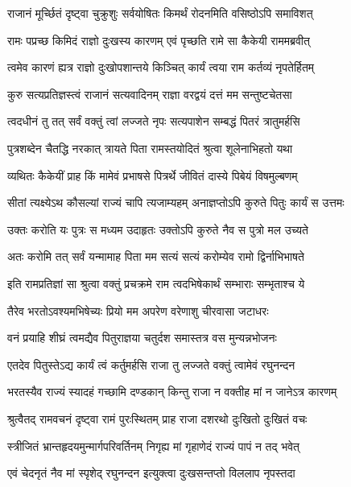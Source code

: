 \twolineshloka
{राजानं मूर्च्छितं दृष्ट्वा चुक्रुशुः सर्वयोषितः}
{किमर्थं रोदनमिति वसिष्ठोऽपि समाविशत्} %

\twolineshloka
{रामः पप्रच्छ किमिदं राज्ञो दुःखस्य कारणम्}
{एवं पृच्छति रामे सा कैकेयी राममब्रवीत्} %

\twolineshloka
{त्वमेव कारणं ह्यत्र राज्ञो दुःखोपशान्तये}
{किञ्चित् कार्यं त्वया राम कर्तव्यं नृपतेर्हितम्} %

\twolineshloka
{कुरु सत्यप्रतिज्ञस्त्वं राजानं सत्यवादिनम्}
{राज्ञा वरद्वयं दत्तं मम सन्तुष्टचेतसा} %

\twolineshloka
{त्वदधीनं तु तत् सर्वं वक्तुं त्वां लज्जते नृपः}
{सत्यपाशेन सम्बद्धं पितरं त्रातुमर्हसि} %

\twolineshloka
{पुत्रशब्देन चैतद्धि नरकात् त्रायते पिता}
{रामस्तयोदितं श्रुत्वा शूलेनाभिहतो यथा} %

\twolineshloka
{व्यथितः कैकेयीं प्राह किं मामेवं प्रभाषसे}
{पित्रर्थे जीवितं दास्ये पिबेयं विषमुल्बणम्} %

\twolineshloka
{सीतां त्यक्ष्येऽथ कौसल्यां राज्यं चापि त्यजाम्यहम्}
{अनाज्ञप्तोऽपि कुरुते पितुः कार्यं स उत्तमः} %

\twolineshloka
{उक्तः करोति यः पुत्रः स मध्यम उदाहृतः}
{उक्तोऽपि कुरुते नैव स पुत्रो मल उच्यते} %

\twolineshloka
{अतः करोमि तत् सर्वं यन्मामाह पिता मम}
{सत्यं सत्यं करोम्येव रामो द्विर्नाभिभाषते} %

\twolineshloka
{इति रामप्रतिज्ञां सा श्रुत्वा वक्तुं प्रचक्रमे}
{राम त्वदभिषेकार्थं सम्भाराः सम्भृताश्च ये} %

\twolineshloka
{तैरेव भरतोऽवश्यमभिषेच्यः प्रियो मम}
{अपरेण वरेणाशु चीरवासा जटाधरः} %

\twolineshloka
{वनं प्रयाहि शीघ्रं त्वमद्यैव पितुराज्ञया}
{चतुर्दश समास्तत्र वस मुन्यन्नभोजनः} %

\twolineshloka
{एतदेव पितुस्तेऽद्य कार्यं त्वं कर्तुमर्हसि}
{राजा तु लज्जते वक्तुं त्वामेवं रघुनन्दन} %


\twolineshloka
{भरतस्यैव राज्यं स्यादहं गच्छामि दण्डकान्}
{किन्तु राजा न वक्तीह मां न जानेऽत्र कारणम्} %

\twolineshloka
{श्रुत्वैतद् रामवचनं दृष्ट्वा रामं पुरःस्थितम्}
{प्राह राजा दशरथो दुःखितो दुःखितं वचः} %

\twolineshloka
{स्त्रीजितं भ्रान्तहृदयमुन्मार्गपरिवर्तिनम्}
{निगृह्य मां गृहाणेदं राज्यं पापं न तद् भवेत्} %

\twolineshloka
{एवं चेदनृतं नैव मां स्पृशेद् रघुनन्दन}
{इत्युक्त्वा दुःखसन्तप्तो विललाप नृपस्तदा} %

